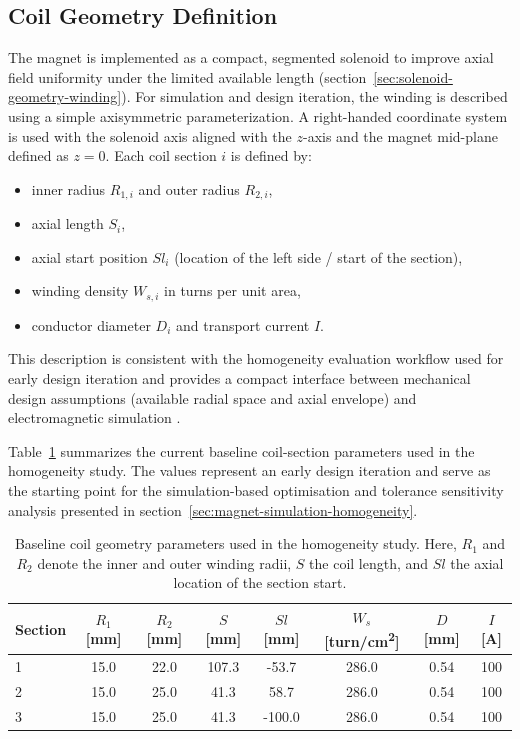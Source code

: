 \documentclass[FM,DP,EN,twoside]{tulthesis}
\begin{document}
\subsection{Coil Geometry Definition}
\label{subsec:coil-geometry-definition}
The magnet is implemented as a compact, segmented solenoid to improve axial field uniformity under the limited available length (section~\ref{sec:solenoid-geometry-winding}). For simulation and design iteration, the winding is described using a simple axisymmetric parameterization. A right-handed coordinate system is used with the solenoid axis aligned with the $z$-axis and the magnet mid-plane defined as $z=0$. Each coil section $i$ is defined by:
\begin{itemize}
  \item inner radius $R_{1,i}$ and outer radius $R_{2,i}$,
  \item axial length $S_i$,
  \item axial start position $S\!l_i$ (location of the left side / start of the section),
  \item winding density $W_{s,i}$ in turns per unit area,
  \item conductor diameter $D_i$ and transport current $I$.
\end{itemize}
This description is consistent with the homogeneity evaluation workflow used for early design iteration and provides a compact interface between mechanical design assumptions (available radial space and axial envelope) and electromagnetic simulation \cite{Kowalska2023MABudget}.

Table~\ref{table:coil-geometry-baseline} summarizes the current baseline coil-section parameters used in the homogeneity study. The values represent an early design iteration and serve as the starting point for the simulation-based optimisation and tolerance sensitivity analysis presented in section~\ref{sec:magnet-simulation-homogeneity}.

\begin{table}[h]
  \centering
  \caption[Baseline Coil Geometry Parameters]{Baseline coil geometry parameters used in the homogeneity study. Here, $R_1$ and $R_2$ denote the inner and outer winding radii, $S$ the coil length, and $S\!l$ the axial location of the section start.}
  \label{table:coil-geometry-baseline}
  \begin{tabular}{|l|c|c|c|c|c|c|c|}
    \hline
    \textbf{Section} & $R_1$ [\si{\milli\meter}] & $R_2$ [\si{\milli\meter}] & $S$ [\si{\milli\meter}] & $S\!l$ [\si{\milli\meter}] & $W_s$ [turn/\si{\centi\meter\squared}] & $D$ [\si{\milli\meter}] & $I$ [\si{\ampere}] \\
    \hline
    1 & 15.0 & 22.0 & 107.3 & -53.7  & 286.0 & 0.54 & 100 \\
    \hline
    2 & 15.0 & 25.0 & 41.3  & 58.7   & 286.0 & 0.54 & 100 \\
    \hline
    3 & 15.0 & 25.0 & 41.3  & -100.0 & 286.0 & 0.54 & 100 \\
    \hline
  \end{tabular}
\end{table}
\end{document}
